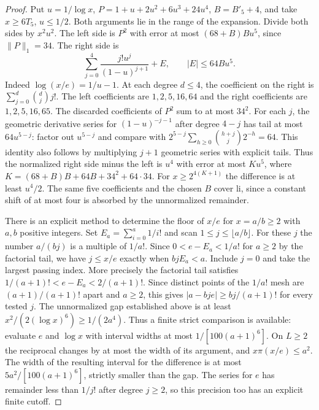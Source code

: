 \begin{proof}
Put $u=1/\log x$, $P=1+u+2u^2+6u^3+24u^4$, $B=B'_5+4$, and take $x\ge6T_5$, $u\le1/2$. Both arguments lie in the range of the expansion. Divide both sides by $x^2u^2$. The left side is $P^2$ with error at most $(68+B)Bu^5$, since $\|P\|_1=34$. The right side is
\[
 \sum_{j=0}^4\frac{j!u^j}{(1-u)^{j+1}}+E,
 \qquad |E|\le64Bu^5.
\]
Indeed $\log(x/e)=1/u-1$. At each degree $d\le4$, the coefficient on the right is $\sum_{j=0}^d\binom{d}{j}j!$. The left coefficients are $1,2,5,16,64$ and the right coefficients are $1,2,5,16,65$. The discarded coefficients of $P^2$ sum to at most $34^2$. For each $j$, the geometric derivative series for $(1-u)^{-j-1}$ after degree $4-j$ has tail at most $64u^{5-j}$: factor out $u^{5-j}$ and compare with $2^{5-j}\sum_{h\ge0}\binom{h+j}{j}2^{-h}=64$. This identity also follows by multiplying $j+1$ geometric series with explicit tails. Thus the normalized right side minus the left is $u^4$ with error at most $Ku^5$, where $K=(68+B)B+64B+34^2+64\cdot34$. For $x\ge2^{4(K+1)}$ the difference is at least $u^4/2$. The same five coefficients and the chosen $B$ cover $\mathrm{li}$, since a constant shift of at most four is absorbed by the unnormalized remainder.

There is an explicit method to determine the floor of $x/e$ for $x=a/b\ge2$ with $a,b$ positive integers. Set $E_a=\sum_{i=0}^a1/i!$ and scan $1\le j\le\lfloor a/b\rfloor$. For these $j$ the number $a/(bj)$ is a multiple of $1/a!$. Since $0<e-E_a<1/a!$ for $a\ge2$ by the factorial tail, we have $j\le x/e$ exactly when $bjE_a<a$. Include $j=0$ and take the largest passing index. More precisely the factorial tail satisfies $1/(a+1)!<e-E_a<2/(a+1)!$. Since distinct points of the $1/a!$ mesh are $(a+1)/(a+1)!$ apart and $a\ge2$, this gives $|a-bje|\ge bj/(a+1)!$ for every tested $j$. The unnormalized gap established above is at least $x^2/(2(\log x)^6)\ge1/(2a^4)$. Thus a finite strict comparison is available: evaluate $e$ and $\log x$ with interval widths at most $1/[100(a+1)^6]$. On $L\ge2$ the reciprocal changes by at most the width of its argument, and $x\pi(x/e)\le a^2$. The width of the resulting interval for the difference is at most $5a^2/[100(a+1)^6]$, strictly smaller than the gap. The series for $e$ has remainder less than $1/j!$ after degree $j\ge2$, so this precision too has an explicit finite cutoff.
\end{proof}

